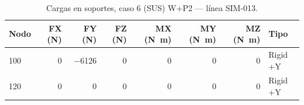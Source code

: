 \begin{table}[htbp]
  \centering
  \footnotesize
  \caption{Cargas en soportes, caso 6 (SUS) W+P2 — línea SIM-013.}
  \label{tab:restricciones-sus}
  \begin{tabular}{lrrrrrrl}
    \toprule
    Nodo & FX (\si{N}) & FY (\si{N}) & FZ (\si{N}) & MX (\si{N.m}) & MY (\si{N.m}) & MZ (\si{N.m}) & Tipo \\
    \midrule
    100 & \num{0} & \num{-6126} & \num{0} & \num{0} & \num{0} & \num{0} & Rigid +Y \\
    120 & \num{0} & \num{0} & \num{0} & \num{0} & \num{0} & \num{0} & Rigid +Y \\
    \bottomrule
  \end{tabular}
\end{table}
